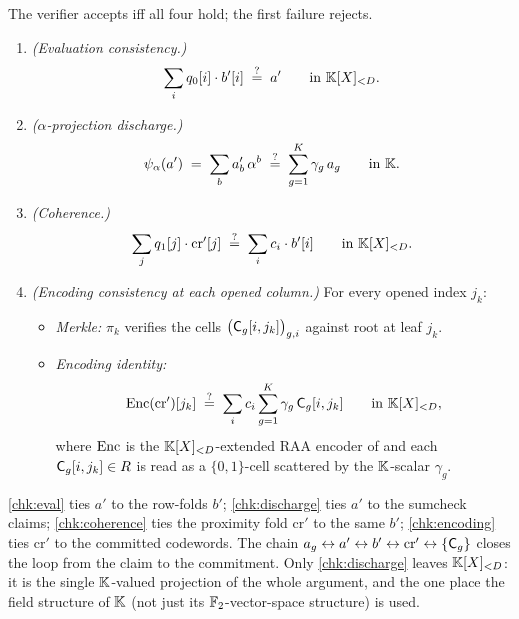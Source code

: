 \begin{construction}
\label{cons:checks}
The verifier accepts iff all four hold; the first failure rejects.
\begin{enumerate}[leftmargin=3.4em, label=\emph{Check \arabic*.}, ref=Check~\arabic*]
  \item\label{chk:eval} \emph{(Evaluation consistency.)}
    \[
      \sum_{i} q_0[i]\cdot b'[i] \;\stackrel{?}{=}\; a'
      \qquad\text{in } \mathbb{K}[X]_{<D}.
    \]
  \item\label{chk:discharge} \emph{($\alpha$-projection discharge.)}
    \[
      \psi_{\alpha}(a') \;=\; \sum_{b} a'_b\,\alpha^b
      \;\stackrel{?}{=}\; \sum_{g=1}^{K} \gamma_g\,a_g
      \qquad\text{in } \mathbb{K}.
    \]
  \item\label{chk:coherence} \emph{(Coherence.)}
    \[
      \sum_{j} q_1[j]\cdot \mathrm{cr}'[j]
      \;\stackrel{?}{=}\;
      \sum_{i} c_i\cdot b'[i]
      \qquad\text{in } \mathbb{K}[X]_{<D}.
    \]
  \item\label{chk:encoding} \emph{(Encoding consistency at each opened
    column.)} For every opened index $j_k$:
    \begin{itemize}[leftmargin=2em, label=---]
      \item \emph{Merkle:} $\pi_k$ verifies the cells
        $\bigl(\mathsf{C}_g[i,j_k]\bigr)_{g,i}$ against $\mathrm{root}$ at leaf
        $j_k$.
      \item \emph{Encoding identity:}
        \[
          \operatorname{Enc}(\mathrm{cr}')[j_k]
          \;\stackrel{?}{=}\;
          \sum_{i} c_i \sum_{g=1}^{K} \gamma_g\,\mathsf{C}_g[i,j_k]
          \qquad\text{in } \mathbb{K}[X]_{<D},
        \]
        where $\operatorname{Enc}$ is the $\mathbb{K}[X]_{<D}$-extended RAA encoder of
         and each $\mathsf{C}_g[i,j_k]\in R$ is
        read as a $\{0,1\}$-cell scattered by the $\mathbb{K}$-scalar $\gamma_g$.
    \end{itemize}
\end{enumerate}
\end{construction}

\begin{remark}
\ref{chk:eval} ties $a'$ to the row-folds $b'$; \ref{chk:discharge} ties
$a'$ to the sumcheck claims; \ref{chk:coherence} ties the proximity fold
$\mathrm{cr}'$ to the same $b'$; \ref{chk:encoding} ties $\mathrm{cr}'$ to
the committed codewords. The chain
$a_g \leftrightarrow a' \leftrightarrow b' \leftrightarrow
\mathrm{cr}' \leftrightarrow \{\mathsf{C}_g\}$ closes the loop from the
claim to the commitment. Only \ref{chk:discharge} leaves $\mathbb{K}[X]_{<D}$: it is
the single $\mathbb{K}$-valued projection of the whole argument, and the one
place the field structure of $\mathbb{K}$ (not just its $\mathbb{F}_2$-vector-space
structure) is used.
\end{remark}

